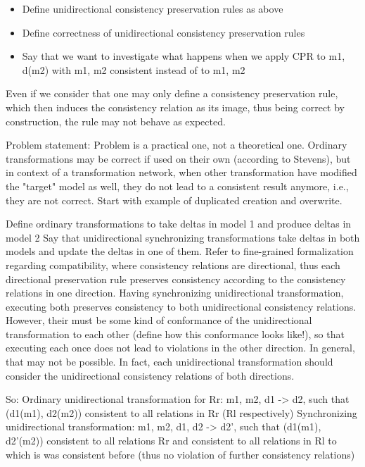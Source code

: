 \begin{itemize}
    \item Define unidirectional consistency preservation rules as above
    \item Define correctness of unidirectional consistency preservation rules
    \item Say that we want to investigate what happens when we apply CPR to m1, d(m2) with m1, m2 consistent instead of to m1, m2
\end{itemize}



Even if we consider that one may only define a consistency preservation rule, which then induces the consistency relation as its image, thus being correct by construction, the rule may not behave as expected.


Problem statement: Problem is a practical one, not a theoretical one.
Ordinary transformations may be correct if used on their own (according to Stevens), but in context of a transformation network, when other transformation have modified the "target" model as well, they do not lead to a consistent result anymore, i.e., they are not correct.
Start with example of duplicated creation and overwrite.

Define ordinary transformations to take deltas in model 1 and produce deltas in model 2
Say that unidirectional synchronizing transformations take deltas in both models and update the deltas in one of them.
Refer to fine-grained formalization regarding compatibility, where consistency relations are directional, thus each directional preservation rule preserves consistency according to the consistency relations in one direction.
Having synchronizing unidirectional transformation, executing both preserves consistency to both unidirectional consistency relations. However, their must be some kind of conformance of the unidirectional transformation to each other (define how this conformance looks like!), so that executing each once does not lead to violations in the other direction. In general, that may not be possible. In fact, each unidirectional transformation should consider the unidirectional consistency relations of both directions.

So:
Ordinary unidirectional transformation for Rr: m1, m2, d1 -> d2, such that (d1(m1), d2(m2)) consistent to all relations in Rr (Rl respectively)
Synchronizing unidirectional transformation: m1, m2, d1, d2 -> d2', such that (d1(m1), d2'(m2)) consistent to all relations Rr and consistent to all relations in Rl to which is was consistent before (thus no violation of further consistency relations)

